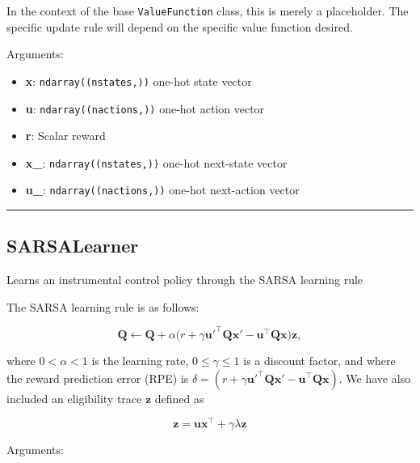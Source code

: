 In the context of the base \texttt{ValueFunction} class, this is merely
a placeholder. The specific update rule will depend on the specific
value function desired.

Arguments:

\begin{itemize}
\tightlist
\item
  \textbf{x}: \texttt{ndarray((nstates,))} one-hot state vector
\item
  \textbf{u}: \texttt{ndarray((nactions,))} one-hot action vector
\item
  \textbf{r}: Scalar reward
\item
  \textbf{x\_}: \texttt{ndarray((nstates,))} one-hot next-state vector
\item
  \textbf{u\_}: \texttt{ndarray((nactions,))} one-hot next-action vector
\end{itemize}

\begin{center}\rule{0.5\linewidth}{\linethickness}\end{center}

\hypertarget{sarsalearner}{%
\subsection{SARSALearner}\label{sarsalearner}}

\begin{Shaded}
\begin{Highlighting}[]
\end{Highlighting}
\end{Shaded}

Learns an instrumental control policy through the SARSA learning rule

The SARSA learning rule is as follows:

\[
\mathbf Q \gets \mathbf Q + \alpha \big(r + \gamma \mathbf u'^\top \mathbf Q \mathbf x' - \mathbf u^\top \mathbf Q \mathbf x \big) \mathbf z,
\]

where \(0 < \alpha < 1\) is the learning rate, \(0 \leq \gamma \leq 1\)
is a discount factor, and where the reward prediction error (RPE) is
\(\delta = (r + \gamma \mathbf u'^\top \mathbf Q \mathbf x' - \mathbf u^\top \mathbf Q \mathbf x)\).
We have also included an eligibility trace \(\mathbf z\) defined as

\[
\mathbf z = \mathbf u \mathbf x^\top +  \gamma \lambda \mathbf z
\]

Arguments:

